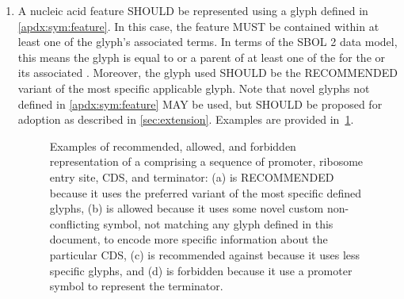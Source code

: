 \begin{enumerate}
\item A nucleic acid feature SHOULD be represented using a glyph defined in \ref{apdx:sym:feature}.  In this case, the feature MUST be contained within at least one of the glyph's associated terms.
In terms of the SBOL 2 data model, this means the glyph is equal to or a parent of at least one of the  for the  or its associated .
	Moreover, the glyph used SHOULD be the RECOMMENDED variant of the most specific applicable glyph.  Note that novel glyphs not defined in \ref{apdx:sym:feature} MAY be used, but SHOULD be proposed for adoption as described in \ref{sec:extension}.
	Examples are provided in~\ref{exa:2f}.
	\begin{figure}[h!]
	\centering
	\caption{Examples of recommended, allowed, and forbidden representation of a  comprising a sequence of promoter, ribosome entry site, CDS, and terminator: (a) is RECOMMENDED because it uses the preferred variant of the most specific defined glyphs, (b) is allowed because it uses some novel custom non-conflicting symbol, not matching any glyph defined in this document, to encode more specific information about the particular CDS, (c) is recommended against because it uses less specific glyphs, and (d) is forbidden because it use a promoter symbol to represent the terminator.}
	\label{exa:2f}
	\end{figure}
\end{enumerate}


